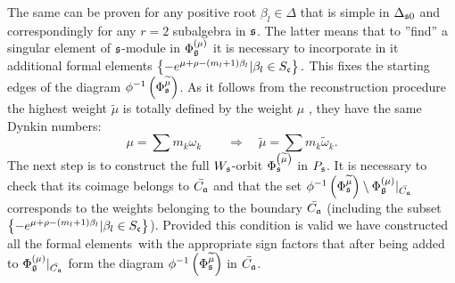 \documentclass[12pt]{article}
\begin{document}
The same can be proven for any positive root $\beta _{l}\in \Delta $ that is
simple in $\Delta _{\frak{s}0}$ and correspondingly for any $r=2$ subalgebra
in $\frak{s}$. The latter means that to ''find'' a singular element of $%
\frak{s}$-module in $\Phi _{\frak{g}}^{\left( \mu \right) }$ it is necessary
to incorporate in it additional formal elements $\left\{ -e^{\mu +\rho
-\left( m_{l}+1\right) \beta _{l}}|\beta _{l}\in S_{\frak{c}}\right\}.$ This
fixes the starting edges of the diagram $\phi ^{-1}\left( \Phi _{\frak{s}}^{%
\widetilde{\mu }}\right) $. As it follows from the reconstruction procedure
the highest weight $\widetilde{\mu }$ is totally defined by the weight $\mu $%
, they have the same Dynkin numbers:
\begin{equation}
\mu =\sum m_{k}\omega _{k}\qquad \Longrightarrow \quad \widetilde{\mu }=\sum
m_{k}\widetilde{\omega }_{k} . \label{new h weight}
\end{equation}
The next step is to construct the full $W_{\frak{s}}$-orbit $\Phi _{\frak{s}%
}^{\left( \widetilde{\mu }\right) }$  in $P_{\frak{s}}$. It is necessary to check
that its coimage belongs to $\bar{C_{\frak{a}}}$ and that the set $\phi
^{-1}\left( \Phi _{\frak{s}}^{\widetilde{\mu }}\right) \setminus \Phi _{%
\frak{g}}^{\left( \mu \right) }|_{\bar{C_{\frak{a}}}}$ corresponds to the
weights belonging to the boundary $\bar{C_{\frak{a}}}$ (including the subset
$\left\{ -e^{\mu +\rho -\left( m_{l}+1\right) \beta _{l}}|\beta _{l}\in S_{%
\frak{c}}\right\} $). Provided this condition is valid we have constructed all the formal elements\ with
the appropriate sign factors that after being added to $\Phi _{\frak{g}%
}^{\left( \mu \right) }|_{\bar{C_{\frak{a}}}}$ form the diagram $\phi
^{-1}\left( \Phi _{\frak{s}}^{\widetilde{\mu }}\right) $ in $\bar{C_{\frak{a}%
}}$.
\end{document}

